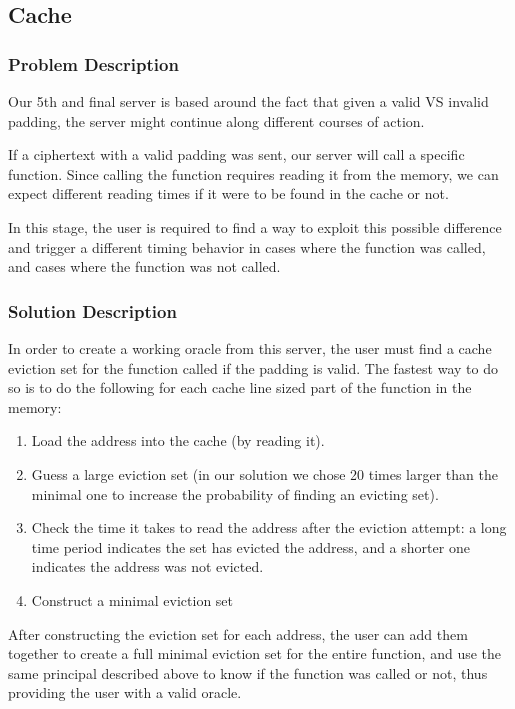 \documentclass[sigconf]{acmart}
\begin{document}
\subsection{Cache}
\subsubsection{Problem Description}
Our 5th and final server is based around the fact that given a valid VS invalid padding, the server might continue along different courses of action. 

If a ciphertext with a valid padding was sent, our server will call a specific function. Since calling the function requires reading it from the memory, we can expect different reading times if it were to be found in the cache or not.

In this stage, the user is required to find a way to exploit this possible difference and trigger a different timing behavior in cases where the function was called, and cases where the function was not called.

\subsubsection{Solution Description}
In order to create a working oracle from this server, the user must find a cache eviction set for the function called if the padding is valid. The fastest way to do so is to do the following for each cache line sized part of the function in the memory:

\begin{enumerate}
    \item Load the address into the cache (by reading it).
    \item Guess a large eviction set (in our solution we chose 20 times larger than the minimal one to increase the probability of finding an evicting set).
    \item Check the time it takes to read the address after the eviction attempt: a long time period indicates the set has evicted the address, and a shorter one indicates the address was not evicted.
    \item Construct a minimal eviction set
\end{enumerate}

After constructing the eviction set for each address, the user can add them together to create a full minimal eviction set for the entire function, and use the same principal described above to know if the function was called or not, thus providing the user with a valid oracle.
\end{document}
